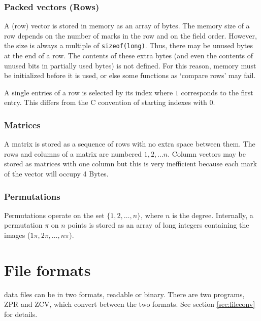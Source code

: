 {\subsubsection{Packed vectors (Rows)}
A (row) vector is stored in memory as an array of bytes. The memory
size of a row depends on the number of marks in the row and on the
field order. However, the size is always a multiple of
{\tt sizeof(long)}. Thus, there may be unused bytes at the end of a
row. The contents of these extra bytes (and even the contents of
unused bits in partially used bytes) is not defined. For this reason,
memory must be initialized before it is used, or else some functions
as `compare rows' may fail.

A single entries of a row is selected by its index where $1$
corresponds to the first entry. This differs from the C convention
of starting indexes with 0.


\subsubsection{Matrices}
A matrix is stored as a sequence of rows with no extra space between
them. The rows and columns of a matrix are numbered $1,2,\ldots n$.
Column vectors may be stored as matrices with one column but this is
very inefficient because each mark of the vector will occupy 4 Bytes.


\subsubsection{Permutations}
Permutations operate on the set $\{1,2,\ldots,n\}$, where $n$ is the
degree. Internally, a permutation $\pi$ on $n$ points is stored as an
array of long integers containing the images ($1\pi,2\pi,\ldots,n\pi$).


\section{File formats}\label{sec:filefmt}

{\MeatAxe} data files can be in two formats, readable or binary.
There are two programs, ZPR and ZCV, which convert between the two
formats. See section \ref{sec:fileconv} for details.

}
